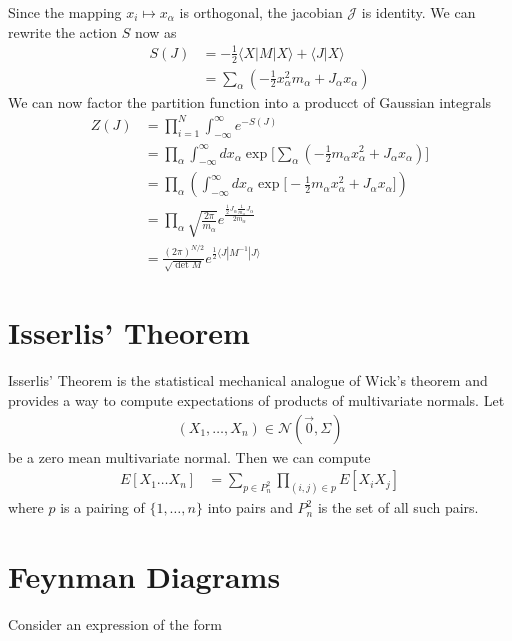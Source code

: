 \documentclass[book.tex]{subfiles}
\begin{document}
Since the mapping $x_i \mapsto x_\alpha$ is orthogonal, the jacobian $\mathcal{J}$ is identity. We can rewrite the action $S$ now as
\begin{align}
    S(J) &= -\frac{1}{2}\langle X | M | X \rangle + \langle J | X \rangle \\
    &= \sum_{\alpha} \left ( -\frac{1}{2}x_\alpha^2m_\alpha + J_\alpha x_{\alpha} \right )
\end{align}
We can now factor the partition function into a producct of Gaussian integrals
\begin{align}
    Z(J) &= \prod_{i=1}^N \int_{-\infty}^{\infty} e^{-S(J)} \\
    &= \prod_{\alpha} \int_{-\infty}^{\infty} dx_\alpha \exp \Bigg [ \sum_{\alpha} \left ( -\frac{1}{2}m_\alpha x_\alpha^2 + J_\alpha x_\alpha \right ) \Bigg ] \\
    &= \prod_{\alpha} \left ( \int_{-\infty}^{\infty} dx_{\alpha} \exp \Bigg [ -\frac{1}{2}m_\alpha x_\alpha^2 + J_\alpha x_\alpha \Bigg ] \right ) \\
    &= \prod_{\alpha} \sqrt{\frac{2\pi}{m_\alpha}} e^{\frac{\frac{1}{2}J_\alpha\frac{1}{m_\alpha}J_\alpha}{2m_{\alpha}}} \\
    &= \frac{(2\pi)^{N/2}}{\sqrt{\det M}} e^{\frac{1}{2}\langle J | M^{-1}| J \rangle}
\end{align}


\section{Isserlis' Theorem}
Isserlis' Theorem is the statistical mechanical analogue of Wick's theorem and provides a way to compute expectations of products of multivariate normals. Let 
\begin{align}
(X_1,\dotsc, X_n) \in \mathcal{N}(\vec{0}, \Sigma)
\end{align}
be a zero mean multivariate normal. Then we can compute
\begin{align}
    E[X_1\dotsc X_n] &= \sum_{p \in P^2_n} \prod_{(i,j) \in p}  E[X_i X_j]
\end{align}
where $p$ is a pairing of $\{1,\dotsc, n\}$ into pairs and $P^2_n$ is the set of all such pairs.
\section{Feynman Diagrams}
Consider an expression of the form
\end{document}

